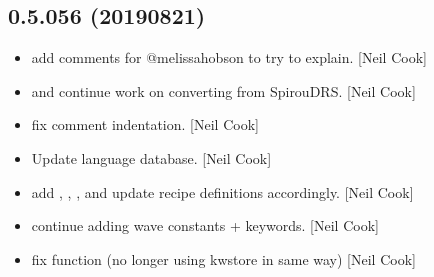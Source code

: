 \documentclass[a4paper,10pt,english]{report}
\begin{document}
\subsection{0.5.056 (2019\sphinxhyphen{}08\sphinxhyphen{}21)}
\label{\detokenize{misc/changelog:id106}}\begin{itemize}
\item {} 
 \sphinxhyphen{} add comments for @melissa\sphinxhyphen{}hobson to try to
explain. {[}Neil Cook{]}

\item {} 
 and  \sphinxhyphen{} continue work on
converting from SpirouDRS. {[}Neil Cook{]}

\item {} 
 \sphinxhyphen{} fix comment indentation. {[}Neil Cook{]}

\item {} 
Update language database. {[}Neil Cook{]}

\item {} 
 \sphinxhyphen{} add ,
, ,  and update recipe
definitions accordingly. {[}Neil Cook{]}

\item {} 
 \sphinxhyphen{} continue adding wave constants + keywords. {[}Neil
Cook{]}

\item {} 
 \sphinxhyphen{} fix  function (no longer using
kwstore in same way) {[}Neil Cook{]}

\end{itemize}
\end{document}
